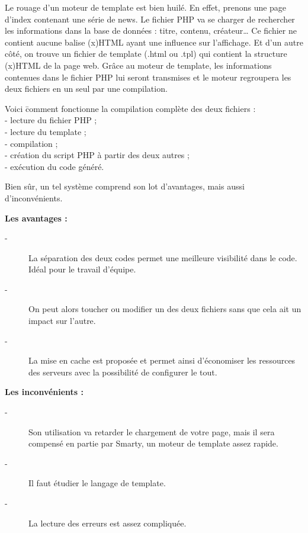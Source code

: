 \documentclass[12pt,a4paper,titlepage,twoside]{report}
\begin{document}
Le rouage d'un moteur de template est bien huilé. En effet, prenons une page d'index contenant une série de news. Le fichier PHP va se charger de rechercher les informations dans la base de données : titre, contenu, créateur… \newline
Ce fichier ne contient aucune balise (x)HTML ayant une influence sur l'affichage. Et d'un autre côté, on trouve un fichier de template (.html ou .tpl) qui contient la structure (x)HTML de la page web. Grâce au moteur de template, les informations contenues dans le fichier PHP lui seront transmises et le moteur regroupera les deux fichiers en un seul par une compilation. \newline

\begin{tabbing}
Voici \= comment fonctionne la compilation complète des deux fichiers : \\
\> - lecture du fichier PHP ; \\
\> - lecture du template ; \\
\> - compilation ; \\
\> - création du script PHP à partir des deux autres ; \\
\> - exécution du code généré. \\
\end{tabbing}

Bien sûr, un tel système comprend son lot d'avantages, mais aussi d'inconvénients. \newline

\begin{flushleft}
\bf
Les avantages :
\end{flushleft}
\begin{description}
\item[ - ] La séparation des deux codes permet une meilleure visibilité dans le code. Idéal pour le travail d'équipe. 
\item[ - ] On peut alors toucher ou modifier un des deux fichiers sans que cela ait un impact sur l'autre. 
\item[ - ] La mise en cache est proposée et permet ainsi d'économiser les ressources des serveurs avec la possibilité de configurer le tout. 
\end{description}

\begin{flushleft}
\bf
Les inconvénients :
\end{flushleft} 
\begin{description}
\item[ - ] Son utilisation va retarder le chargement de votre page, mais il sera compensé en partie par Smarty, un moteur de template assez rapide.
\item[ - ] Il faut étudier le langage de template.
\item[ - ] La lecture des erreurs est assez compliquée. \newline
\end{description}
\end{document}
